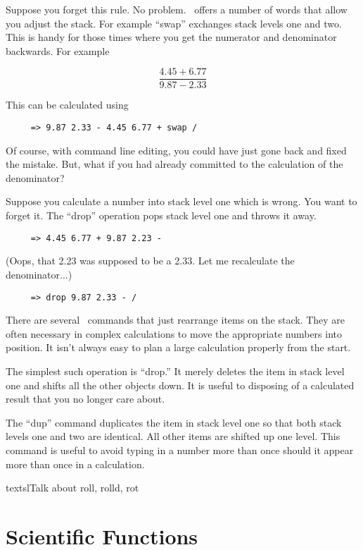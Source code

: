 \documentclass{report}
\begin{document}
Suppose you forget this rule. No problem. \CLAC\ offers a number of words that allow you adjust
the stack. For example ``swap'' exchanges stack levels one and two. This is handy for those
times where you get the numerator and denominator backwards. For example

\begin{displaymath}
     \frac{ 4.45 + 6.77 }{ 9.87 - 2.33 }
\end{displaymath}

This can be calculated using

\begin{verbatim}
     => 9.87 2.33 - 4.45 6.77 + swap /
\end{verbatim}

Of course, with command line editing, you could have just gone back and fixed the mistake. But,
what if you had already committed to the calculation of the denominator?

Suppose you calculate a number into stack level one which is wrong. You want to forget it. The
``drop'' operation pops stack level one and throws it away.

\begin{verbatim}
     => 4.45 6.77 + 9.87 2.23 -
\end{verbatim}

(Oops, that 2.23 was supposed to be a 2.33. Let me recalculate the denominator...)

\begin{verbatim}
     => drop 9.87 2.33 - /
\end{verbatim}

There are several \CLAC\ commands that just rearrange items on the stack. They are often
necessary in complex calculations to move the appropriate numbers into position. It isn't always
easy to plan a large calculation properly from the start.

The simplest such operation is ``drop.'' It merely deletes the item in stack level one and
shifts all the other objects down. It is useful to disposing of a calculated result that you no
longer care about.

The ``dup'' command duplicates the item in stack level one so that both stack levels one and two
are identical. All other items are shifted up one level. This command is useful to avoid typing
in a number more than once should it appear more than once in a calculation.

textsl{Talk about roll, rolld, rot}

\section{Scientific Functions}
\end{document}
